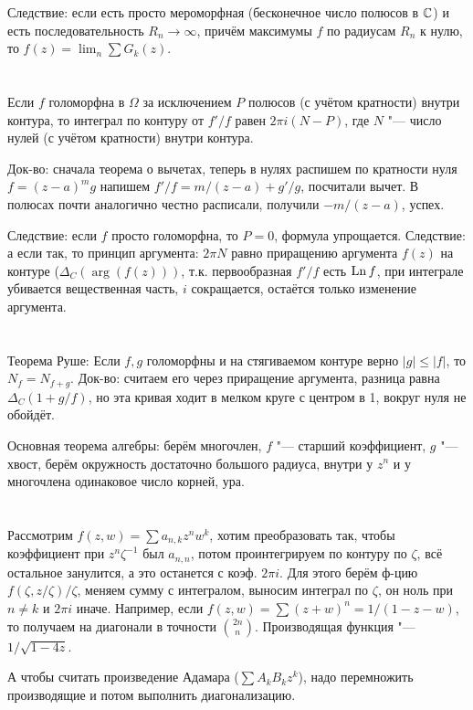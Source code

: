 	Следствие: если есть просто мероморфная (бесконечное число полюсов в $\mathbb{C}$) и есть последовательность $R_n \to \infty$,
	причём максимумы $f$ по радиусам $R_n$ к нулю, то $f(z)=\lim_n \sum G_k(z)$.
	\TODO

\section{} %
	\TODO

\section{} %
	Если $f$ голоморфна в $\Omega$ за исключением $P$ полюсов (с учётом кратности) внутри контура,
	то интеграл по контуру от $f'/f$ равен $2 \pi i (N-P)$,
	где $N$ "--- число нулей (с учётом кратности) внутри контура.

	Док-во: сначала теорема о вычетах, теперь в нулях распишем по кратности нуля $f=(z-a)^mg$
	напишем $f'/f=m/(z-a)+g'/g$, посчитали вычет.
	В полюсах почти аналогично честно расписали, получили $-m/(z-a)$, успех.

	Следствие: если $f$ просто голоморфна, то $P=0$, формула упрощается.
	Следствие: а если так, то принцип аргумента: $2\pi N$ равно приращению аргумента $f(z)$ на контуре
	($\Delta_C(\arg(f(z)))$, т.к. первообразная $f'/f$ есть $\operatorname{Ln} f$, при интеграле убивается
	вещественная часть, $i$ сокращается, остаётся только изменение аргумента.

\section{} %
	Теорема Руше: Если $f, g$ голоморфны и на стягиваемом контуре верно $|g|\le |f|$, то $N_f = N_{f+g}$.
	Док-во: считаем его через приращение аргумента, разница равна $\Delta_C(1+g/f)$, но эта кривая
	ходит в мелком круге с центром в 1, вокруг нуля не обойдёт.

	Основная теорема алгебры: берём многочлен, $f$ "--- старший коэффициент, $g$ "--- хвост,
	берём окружность достаточно большого радиуса, внутри у $z^n$ и у многочлена одинаковое число корней,
	ура.

\section{} %
	Рассмотрим $f(z, w)=\sum a_{n,k}z^nw^k$, хотим преобразовать так, чтобы
	коэффициент при $z^n\zeta^{-1}$ был $a_{n,n}$, потом проинтегрируем по контуру по $\zeta$,
	всё остальное занулится, а это останется с коэф. $2\pi i$.
	Для этого берём ф-цию $f(\zeta, z/\zeta)/\zeta$, меняем сумму с интегралом,
	выносим интеграл по $\zeta$, он ноль при $n \neq k$ и $2\pi i$ иначе.
	Например, если $f(z,w)=\sum (z+w)^n=1/(1-z-w)$, то получаем на диагонали в точности $\binom{2n}{n}$.
	Производящая функция "--- $1/\sqrt{1-4z}$.

	А чтобы считать произведение Адамара ($\sum A_kB_kz^k$), надо перемножить производящие
	и потом выполнить диагонализацию.

\section{} %
	\TODO

\section{} %
	\TODO
